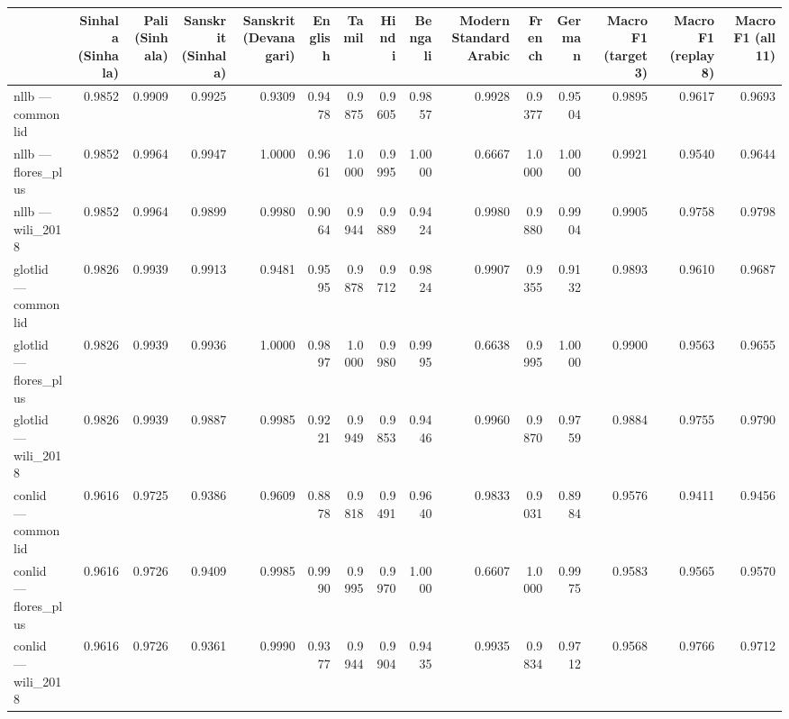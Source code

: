 \begin{tabular}{lrrrrrrrrrrrrrr}
\toprule
 & Sinhala (Sinhala) & Pali (Sinhala) & Sanskrit (Sinhala) & Sanskrit (Devanagari) & English & Tamil & Hindi & Bengali & Modern Standard Arabic & French & German & Macro F1 (target 3) & Macro F1 (replay 8) & Macro F1 (all 11) \\
\midrule
nllb — commonlid & 0.9852 & 0.9909 & 0.9925 & 0.9309 & 0.9478 & 0.9875 & 0.9605 & 0.9857 & 0.9928 & 0.9377 & 0.9504 & 0.9895 & 0.9617 & 0.9693 \\
nllb — flores\_plus & 0.9852 & 0.9964 & 0.9947 & 1.0000 & 0.9661 & 1.0000 & 0.9995 & 1.0000 & 0.6667 & 1.0000 & 1.0000 & 0.9921 & 0.9540 & 0.9644 \\
nllb — wili\_2018 & 0.9852 & 0.9964 & 0.9899 & 0.9980 & 0.9064 & 0.9944 & 0.9889 & 0.9424 & 0.9980 & 0.9880 & 0.9904 & 0.9905 & 0.9758 & 0.9798 \\
glotlid — commonlid & 0.9826 & 0.9939 & 0.9913 & 0.9481 & 0.9595 & 0.9878 & 0.9712 & 0.9824 & 0.9907 & 0.9355 & 0.9132 & 0.9893 & 0.9610 & 0.9687 \\
glotlid — flores\_plus & 0.9826 & 0.9939 & 0.9936 & 1.0000 & 0.9897 & 1.0000 & 0.9980 & 0.9995 & 0.6638 & 0.9995 & 1.0000 & 0.9900 & 0.9563 & 0.9655 \\
glotlid — wili\_2018 & 0.9826 & 0.9939 & 0.9887 & 0.9985 & 0.9221 & 0.9949 & 0.9853 & 0.9446 & 0.9960 & 0.9870 & 0.9759 & 0.9884 & 0.9755 & 0.9790 \\
conlid — commonlid & 0.9616 & 0.9725 & 0.9386 & 0.9609 & 0.8878 & 0.9818 & 0.9491 & 0.9640 & 0.9833 & 0.9031 & 0.8984 & 0.9576 & 0.9411 & 0.9456 \\
conlid — flores\_plus & 0.9616 & 0.9726 & 0.9409 & 0.9985 & 0.9990 & 0.9995 & 0.9970 & 1.0000 & 0.6607 & 1.0000 & 0.9975 & 0.9583 & 0.9565 & 0.9570 \\
conlid — wili\_2018 & 0.9616 & 0.9726 & 0.9361 & 0.9990 & 0.9377 & 0.9944 & 0.9904 & 0.9435 & 0.9935 & 0.9834 & 0.9712 & 0.9568 & 0.9766 & 0.9712 \\
\bottomrule
\end{tabular}

